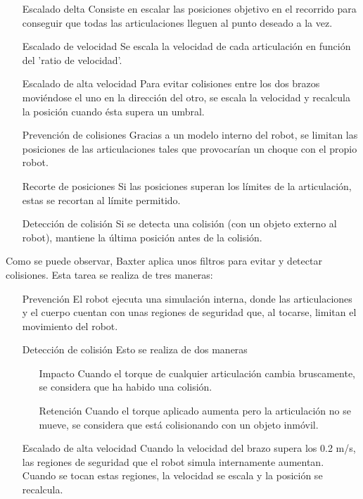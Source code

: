 \begin{enumerate}
\item [Escalado delta] Consiste en escalar las posiciones objetivo en el recorrido para conseguir que todas las articulaciones lleguen al punto deseado a la vez.
\item [Escalado de velocidad] Se escala la velocidad de cada articulación en función del 'ratio de velocidad'.
\item [Escalado de alta velocidad] Para evitar colisiones entre los dos brazos moviéndose el uno en la dirección del otro, se escala la velocidad y recalcula la posición cuando ésta supera un umbral.
\item [Prevención de colisiones] Gracias a un modelo interno del robot, se limitan las posiciones de las articulaciones tales que provocarían un choque con el propio robot.
\item [Recorte de posiciones] Si las posiciones superan los límites de la articulación, estas se recortan al límite permitido.
\item [Detección de colisión] Si se detecta una colisión (con un objeto externo al robot), mantiene la última posición antes de la colisión.
\end{enumerate}

Como se puede observar, Baxter aplica unos filtros para evitar y detectar colisiones. Esta tarea se realiza de tres maneras:

\begin{itemize}
\item [Prevención] El robot ejecuta una simulación interna, donde las articulaciones y el cuerpo cuentan con unas regiones de seguridad que, al tocarse, limitan el movimiento del robot.
\item [Detección de colisión] Esto se realiza de dos maneras
\begin{enumerate}
\item [Impacto] Cuando el torque de cualquier articulación cambia bruscamente, se considera que ha habido una colisión.
\item [Retención] Cuando el torque aplicado aumenta pero la articulación no se mueve, se considera que está colisionando con un objeto inmóvil.
\end{enumerate} 
\item [Escalado de alta velocidad] Cuando la velocidad del brazo supera los 0.2 m/s, las regiones de seguridad que el robot simula internamente aumentan. Cuando se tocan estas regiones, la velocidad se escala y la posición se recalcula.
\end{itemize}

